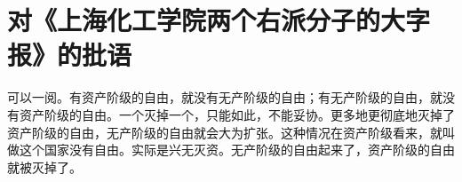 \section[对《上海化工学院两个右派分子的大字报》的批语（一九五八年三月二十二日）]{对《上海化工学院两个右派分子的大字报》的批语}


可以一阅。有资产阶级的自由，就没有无产阶级的自由；有无产阶级的自由，就没有资产阶级的自由。一个灭掉一个，只能如此，不能妥协。更多地更彻底地灭掉了资产阶级的自由，无产阶级的自由就会大为扩张。这种情况在资产阶级看来，就叫做这个国家没有自由。实际是兴无灭资。无产阶级的自由起来了，资产阶级的自由就被灭掉了。

